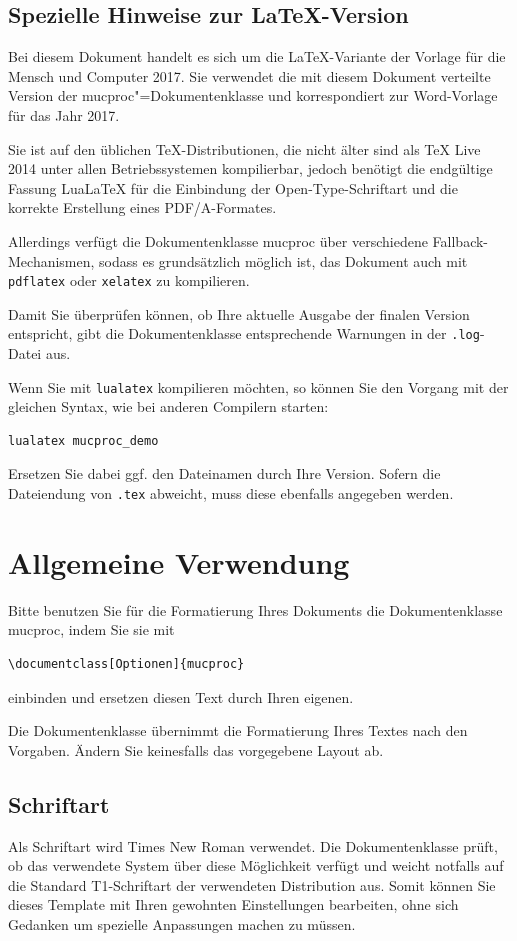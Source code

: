 \documentclass[ngerman]{mucproc}
\newenvironment{minted}[2][]{\endgraf\verbatim}{\endverbatim}
\begin{document}
\subsection{Spezielle Hinweise zur \LaTeX-Version}
Bei diesem Dokument handelt es sich um die \LaTeX-Variante der Vorlage für die Mensch und Computer 2017.
Sie verwendet die mit diesem Dokument verteilte Version der \textsf{mucproc}"=Dokumentenklasse \mucprocVersion{} und korrespondiert zur Word-Vorlage für das Jahr 2017.

Sie ist auf den üblichen \TeX-Distributionen, die nicht älter sind als \TeX{} Live 2014
unter allen Betriebssystemen kompilierbar, jedoch benötigt die endgültige Fassung Lua\LaTeX{}
für die Einbindung der Open-Type-Schriftart und die korrekte Erstellung eines PDF/A-Formates.

Allerdings verfügt die Dokumentenklasse \textsf{mucproc} über verschiedene Fallback-Mechanismen, sodass es grundsätzlich möglich ist, das Dokument auch mit \texttt{pdflatex} oder \texttt{xelatex} zu kompilieren.

Damit Sie überprüfen können, ob Ihre aktuelle Ausgabe der finalen Version entspricht, gibt die Dokumentenklasse entsprechende Warnungen in der \texttt{.log}-Datei aus.

Wenn Sie mit \texttt{lualatex} kompilieren möchten, so können Sie den Vorgang mit der gleichen Syntax, wie bei anderen Compilern starten:

\begin{verbatim}
lualatex mucproc_demo
\end{verbatim}
Ersetzen Sie dabei ggf. den Dateinamen durch Ihre Version. Sofern die Dateiendung von \texttt{.tex} abweicht, muss diese ebenfalls angegeben werden.

\section{Allgemeine Verwendung}
Bitte benutzen Sie für die Formatierung Ihres Dokuments die Dokumentenklasse \textsf{mucproc}, indem Sie sie mit
\begin{verbatim}
\documentclass[Optionen]{mucproc}
\end{verbatim}
einbinden und ersetzen diesen Text durch Ihren eigenen.

Die Dokumentenklasse übernimmt die Formatierung Ihres Textes nach den Vorgaben. Ändern Sie keinesfalls das vorgegebene Layout ab.


\subsection{Schriftart}
Als Schriftart wird Times New Roman verwendet. Die Dokumentenklasse prüft, ob das verwendete System über diese Möglichkeit verfügt und weicht notfalls auf die Standard T1-Schriftart der verwendeten Distribution aus. Somit können Sie dieses Template mit Ihren gewohnten Einstellungen bearbeiten, ohne sich Gedanken um spezielle Anpassungen machen zu müssen.
\end{document}
